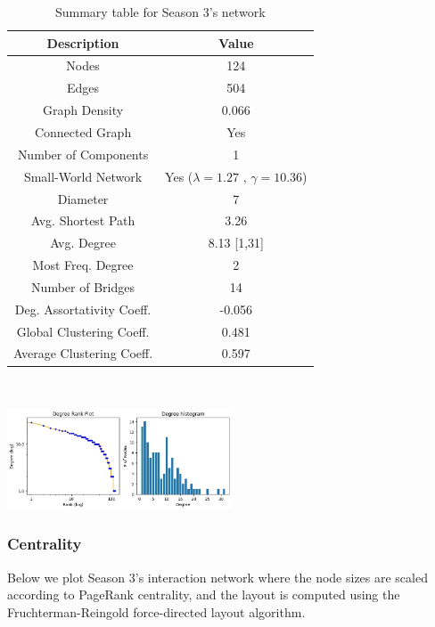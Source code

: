\documentclass[10pt,twocolumn,letterpaper]{article}
\begin{document}
\begin{table}[!h]
    \centering
    \small
    \begin{tabular}{c|c}
        Description & Value  \\
        \hline
        Nodes & 124 \\
        Edges & 504 \\
        Graph Density & 0.066 \\
        Connected Graph & Yes \\
        Number of Components & 1 \\
        Small-World Network & Yes ($\lambda=1.27$ , $\gamma=10.36$) \\
        Diameter & 7 \\
        Avg. Shortest Path & 3.26 \\
        Avg. Degree & 8.13 [1,31] \\
        Most Freq. Degree & 2 \\
        Number of Bridges & 14 \\
        Deg. Assortativity Coeff. & -0.056\\
        Global Clustering Coeff. & 0.481 \\
        Average Clustering Coeff. & 0.597 \\
        \hline 
    \end{tabular}
    \vspace{0.2cm}
    \caption{Summary table for Season 3's network}
    \label{tab:my_label}
\end{table} \\

\begin{center}
    \includegraphics[width=0.5\textwidth]{img/s3/degree_plot.jpg}
\end{center}

\subsubsection{Centrality}

Below we plot Season 3’s interaction network where the node sizes are scaled according to PageRank centrality, and the layout is computed using the Fruchterman-Reingold force-directed layout algorithm.
\end{document}
